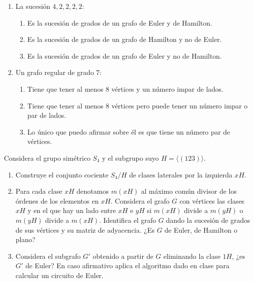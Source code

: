 \begin{ejercicio}
\begin{enumerate}
        \item La sucesión $4, 2, 2, 2, 2$:
        \begin{enumerate}
            \item Es la sucesión de grados de un grafo de Euler y de Hamilton.
            \item Es la sucesión de grados de un grafo de Hamilton y no de Euler.
            \item Es la sucesión de grados de un grafo de Euler y no de Hamilton.
        \end{enumerate}
        \item Un grafo regular de grado 7:
        \begin{enumerate}
            \item Tiene que tener al menos 8 vértices y un número impar de lados.
            \item Tiene que tener al menos 8 vértices pero puede tener un número impar o par de lados.
            \item Lo único que puedo afirmar sobre él es que tiene un número par de vértices.
        \end{enumerate}
    \end{enumerate}
\end{ejercicio}


\begin{ejercicio}\label{ej:1.32}
    Considera el grupo simétrico $S_4$ y el subgrupo suyo $H = \langle (1 2 3) \rangle$.
    \begin{enumerate}
        \item Construye el conjunto cociente $S_4/H$ de clases laterales por la izquierda $xH$.
        \item Para cada clase $xH$ denotamos $m(xH)$ al máximo común divisor de los órdenes de los elementos en $xH$. Considera el grafo $G$ con vértices las clases $xH$ y en el que hay un lado entre $xH$ e $yH$ si $m(xH)$ divide a $m(yH)$ o $m(yH)$ divide a $m(xH)$. Identifica el grafo $G$ dando la sucesión de grados de sus vértices y su matriz de adyacencia. ¿Es $G$ de Euler, de Hamilton o plano?
        \item Considera el subgrafo $G'$ obtenido a partir de $G$ eliminando la clase $1H$, ¿es $G'$ de Euler? En caso afirmativo aplica el algoritmo dado en clase para calcular un circuito de Euler.
    \end{enumerate}
\end{ejercicio}


